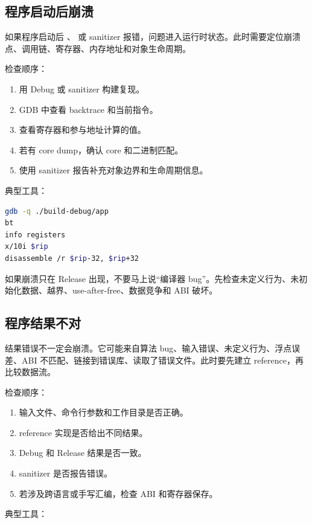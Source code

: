 \subsection{程序启动后崩溃}

如果程序启动后 、 或 sanitizer 报错，问题进入运行时状态。此时需要定位崩溃点、调用链、寄存器、内存地址和对象生命周期。

检查顺序：

\begin{enumerate}
  \item 用 Debug 或 sanitizer 构建复现。
  \item GDB 中查看 backtrace 和当前指令。
  \item 查看寄存器和参与地址计算的值。
  \item 若有 core dump，确认 core 和二进制匹配。
  \item 使用 sanitizer 报告补充对象边界和生命周期信息。
\end{enumerate}

典型工具：

\begin{lstlisting}[language=bash]
gdb -q ./build-debug/app
bt
info registers
x/10i $rip
disassemble /r $rip-32, $rip+32
\end{lstlisting}

如果崩溃只在 Release 出现，不要马上说“编译器 bug”。先检查未定义行为、未初始化数据、越界、use-after-free、数据竞争和 ABI 破坏。

\subsection{程序结果不对}

结果错误不一定会崩溃。它可能来自算法 bug、输入错误、未定义行为、浮点误差、ABI 不匹配、链接到错误库、读取了错误文件。此时要先建立 reference，再比较数据流。

检查顺序：

\begin{enumerate}
  \item 输入文件、命令行参数和工作目录是否正确。
  \item reference 实现是否给出不同结果。
  \item Debug 和 Release 结果是否一致。
  \item sanitizer 是否报告错误。
  \item 若涉及跨语言或手写汇编，检查 ABI 和寄存器保存。
\end{enumerate}

典型工具：

